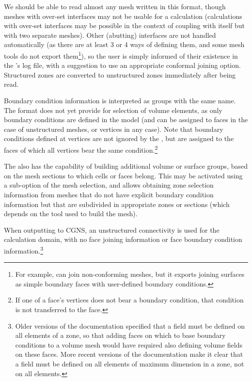{{{We should be able to read almost any mesh written in this format, though
meshes with over-set interfaces may not be usable for a calculation
(calculations with over-set interfaces may be possible in the context of coupling \CS
with itself but with two separate meshes).
Other (abutting) interfaces are not handled automatically (as there are
at least 3 or 4 ways of defining them, and some mesh tools do not export
them\footnote{For example, \icemcfd can join non-conforming meshes, but it
exports joining surfaces as simple boundary faces with user-defined boundary
conditions.}), so the user is simply informed of their existence in the
\pcs's log file, with a suggestion to use an appropriate conformal joining
option. Structured zones are converted to unstructured zones immediately after
being read.

Boundary condition information is interpreted as groups with the same
name. The format does not yet provide for selection of volume elements,
as only boundary conditions are defined in the model (and can be assigned to
faces in the case of unstructured meshes, or vertices in any case).
Note that boundary conditions defined at vertices are not ignored by
the \pcs, but are assigned to the faces of which all vertices bear
the same condition.\footnote{If one of a face's vertices does not bear
a boundary condition, that condition is not transferred to the face.}

The \pcs also has the capability of building additional volume or surface groups,
based on the mesh sections to which cells or faces belong. This may be
activated using a sub-option of the mesh selection, and allows obtaining
zone selection information from meshes that do not have explicit
boundary condition information but that are subdivided in appropriate zones or
sections (which depends on the tool used to build the mesh).

When outputting to CGNS, an unstructured connectivity is used for the calculation
domain, with no face joining information or face boundary condition
information.\footnote{Older versions of the documentation specified that
a field must be defined on all elements of a zone, so that adding faces
on which to base boundary conditions to a volume mesh would have required
also defining volume fields on these faces. More recent versions of the
documentation make it clear that a field must be defined on all elements
of maximum dimension in a zone, not on all elements.}

}}}
